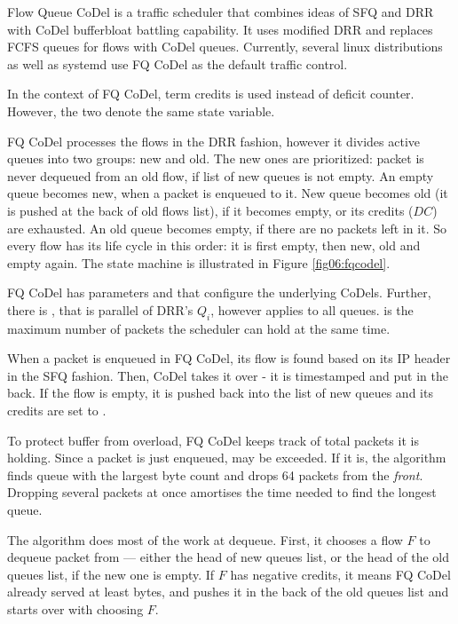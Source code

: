 Flow Queue CoDel \cite{fq_codel} is a traffic scheduler that combines ideas of SFQ and DRR with CoDel bufferbloat battling capability. It uses modified DRR and replaces FCFS queues for flows with CoDel queues. Currently, several linux distributions as well as systemd use FQ CoDel as the default traffic control.

In the context of FQ CoDel, term credits is used instead of deficit counter. However, the two denote the same state variable.

FQ CoDel processes the flows in the DRR fashion, however it divides active queues into two groups: new and old. The new ones are prioritized: packet is never dequeued from an old flow, if list of new queues is not empty. An empty queue becomes new, when a packet is enqueued to it. New queue becomes old (it is pushed at the back of old flows list), if it becomes empty, or its credits ($DC$) are exhausted. An old queue becomes empty, if there are no packets left in it. So every flow has its life cycle in this order: it is first empty, then new, old and empty again. The state machine is illustrated in Figure \ref{fig06:fqcodel}.

FQ CoDel has parameters  and  that configure the underlying CoDels. Further, there is , that is parallel of DRR's $Q_i$, however  applies to all queues.  is the maximum number of packets the scheduler can hold at the same time.

When a packet is enqueued in FQ CoDel, its flow is found based on its IP header in the SFQ fashion. Then, CoDel takes it over - it is timestamped and put in the back. If the flow is empty, it is pushed back into the list of new queues and its credits are set to .

To protect buffer from overload, FQ CoDel keeps track of total packets it is holding. Since a packet is just enqueued,  may be exceeded. If it is, the algorithm finds queue with the largest byte count and drops 64 packets from the \textit{front}. Dropping several packets at once amortises the time needed to find the longest queue.

The algorithm does most of the work at dequeue. First, it chooses a flow $F$ to dequeue packet from --- either the head of new queues list, or the head of the old queues list, if the new one is empty. If $F$ has negative credits, it means FQ CoDel already served at least  bytes, and pushes it in the back of the old queues list and starts over with choosing $F$.

